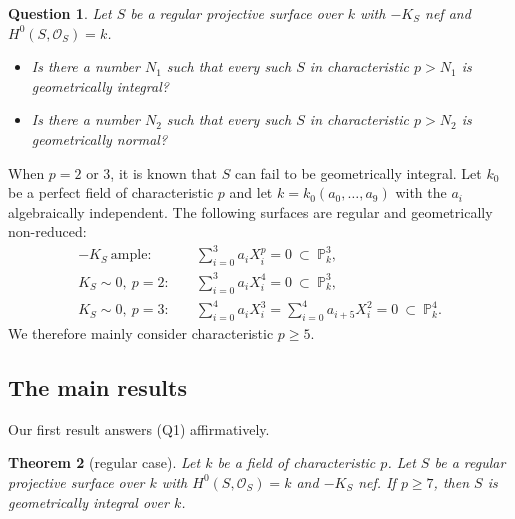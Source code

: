\documentclass[reqno,oneside]{amsart}
\newtheorem{theorem}{Theorem}[section]
\newtheorem{question}[theorem]{Question}
\theoremstyle{definition}
\theoremstyle{plain}
\numberwithin{equation}{section}
\begin{document}
\begin{question}\label{question-ques}
  Let $S$ be a regular projective surface over $k$ with $-K_S$ nef and $H^0(S,\mathcal{O}_S)=k$.
  \begin{itemize}
    \item[\rm (Q1)] Is there a number $N_1$ such that every such $S$ in characteristic $p>N_1$ is geometrically integral?
    \item[\rm (Q2)] Is there a number $N_2$ such that every such $S$ in characteristic $p > N_2$ is geometrically normal?
  \end{itemize}
\end{question}

When $p=2$ or $3$, it is known that $S$ can fail to be geometrically integral.
Let $k_0$ be a perfect field of characteristic $p$ and let $k=k_0(a_0,\ldots,a_9)$ with the $a_i$ algebraically independent.
The following surfaces are regular and geometrically non-reduced:
\begin{align*}
  -K_S\ \text{ample}: &\quad \textstyle\sum_{i=0}^{3}a_iX_i^{p}=0\ \subset\ \mathbb P^3_k , \\
  K_S\sim0,\ p=2: &\quad \textstyle\sum_{i=0}^{3}a_iX_i^{4}=0\ \subset\ \mathbb P^3_k , \\
  K_S\sim0,\ p=3: &\quad \textstyle\sum_{i=0}^{4}a_iX_i^{3}=\sum_{i=0}^{4}a_{i+5}X_i^{2}=0\ \subset\ \mathbb P^4_k .
\end{align*}
We therefore mainly consider characteristic $p\ge5$.

\subsection{The main results}\label{subsection-main-results}%
Our first result answers (Q1) affirmatively.

\begin{theorem}[regular case]\label{theorem-main-regular-case}%
  Let $k$ be a field of characteristic $p$.
  Let $S$ be a regular projective surface over $k$ with $H^0(S,\mathcal{O}_S)=k$ and $-K_S$ nef.
  If $p\ge7$, then $S$ is geometrically integral over $k$.
\end{theorem}
\end{document}
